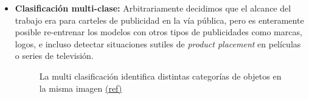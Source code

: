 \documentclass[a4paper]{article}
\begin{document}
\begin{itemize}
\begin{figure}[H]
\end{figure}

\item \textbf{Clasificación multi-clase:} Arbitrariamente decidimos que el alcance del trabajo era para carteles de publicidad en la vía pública, pero es enteramente posible re-entrenar los modelos con otros tipos de publicidades como marcas, logos, e incluso detectar situaciones sutiles de \textit{product placement} en películas o series de televisión.

\begin{figure}[H]
\caption{La multi clasificación identifica distintas categorías de objetos en la misma imagen \scriptsize{\href{https://medium.com/analytics-vidhya/yolo-object-detection-made-easy-7b17cc3e782f/}{(ref)}}}
\end{figure}

\end{itemize}
\end{document}
